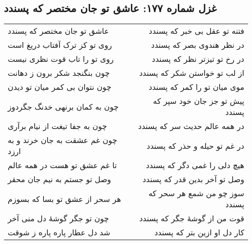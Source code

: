 \begin{center}
\section*{غزل شماره ۱۷۷: عاشق تو جان مختصر که پسندد}
\label{sec:177}
\begin{longtable}{l p{0.5cm} r}
عاشق تو جان مختصر که پسندد
&&
فتنه تو عقل بی خبر که پسندد
\\
روی تو کز ترک آفتاب دریغ است
&&
در نظر هندوی بصر که پسندد
\\
روی تو را تاب قوت نظری نیست
&&
در رخ تو تیزتر نظر که پسندد
\\
چون بنگنجد شکر برون ز دهانت
&&
از لب تو خواستن شکر که پسندد
\\
چون نتوان بی کمر میان تو دیدن
&&
موی میان تو را کمر که پسندد
\\
چون به کمان برنهی خدنگ جگردوز
&&
پیش تو جز جان خود سپر که پسندد
\\
چون به جفا تیغت از نیام برآری
&&
در همه عالم حدیث سر که پسندد
\\
چون غم عشقت به جان خرند و به ارزد
&&
در غم تو حیله و حذر که پسندد
\\
تا غم عشق تو هست در همه عالم
&&
هیچ دلی را غمی دگر که پسندد
\\
وصل تو جستم به نیم جان محقر
&&
وصل تو آخر بدین قدر که پسندد
\\
هر سحر از عشق تو بسا که بسوزم
&&
سوز چو من شمع هر سحر که پسندد
\\
چون تو جگر گوشهٔ دل منی آخر
&&
قوت من از گوشهٔ جگر که پسندد
\\
شد دل عطار پاره پاره ز شوقت
&&
کار دل او ازین بتر که پسندد
\\
\end{longtable}
\end{center}
